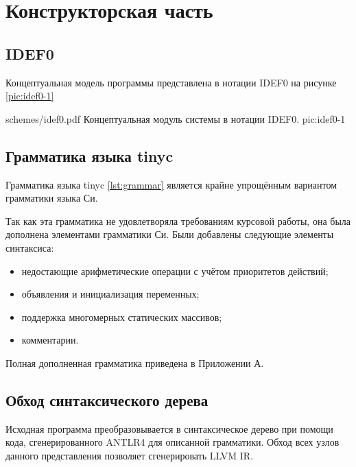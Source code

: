 \section{Конструкторская часть}

\subsection{IDEF0}
Концептуальная модель программы представлена в нотации IDEF0 на рисунке \ref{pic:idef0-1}

\myImage
{schemes/idef0.pdf}
{Концептуальная модуль системы в нотации IDEF0.}
{pic:idef0-1}

\subsection{Грамматика языка tinyc}
Грамматика языка tinyc \ref{lst:grammar} является крайне упрощённым вариантом грамматики языка Си.

\label{lst:grammar}

Так как эта грамматика не удовлетворяла требованиям курсовой работы, она была дополнена элементами грамматики Си. Были добавлены следующие элементы синтаксиса:
\begin{itemize}
    \item недостающие арифметические операции с учётом приоритетов действий;
    \item объявления и инициализация переменных;
    \item поддержка многомерных статических массивов;
    \item комментарии.
\end{itemize}
Полная дополненная грамматика приведена в Приложении А.

\subsection{Обход синтаксического дерева}
Исходная программа преобразовывается в синтаксическое дерево при помощи кода, сгенерированного ANTLR4 для описанной грамматики. Обход всех узлов данного представления позволяет сгенерировать LLVM IR.

